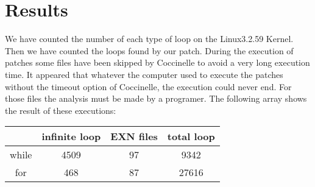 \documentclass[11pt]{article}
\begin{document}
\vspace*{5mm}

\lstset{numbers=left,firstnumber=1,numberfirstline=true}
\begin{lstlisting}[language=C]

\end{lstlisting}

\section{Results}
We have counted the number of each type of loop on the Linux3.2.59 Kernel. Then we have counted the loops found by our patch. During the execution of patches some files have been skipped by Coccinelle to avoid a very long execution time. It appeared that whatever the computer used to execute the patches without the timeout option of Coccinelle, the execution could never end. For those files the analysis must be made by a programer. The following array shows the result of these executions:

\vspace*{5mm}
\begin{tabular}{|c|c|c|c|}
  \hline
    & infinite loop & EXN files & total loop \\
  \hline
  while &  4509  & 97 & 9342 \\
  \hline
  for  & 468 & 87 &  27616 \\
  \hline
\end{tabular} 
\vspace*{5mm}
\end{document}

